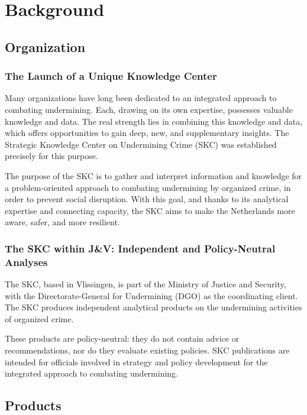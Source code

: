 \section{Background}
\label{sec:Background}

\subsection{Organization}
\label{subsec:Organization}

\subsubsection{The Launch of a Unique Knowledge Center}
\label{subsubsec:SKC-launch}
Many organizations have long been dedicated to an integrated approach to combating undermining. Each, drawing on its own expertise, possesses valuable knowledge and data. The real strength lies in combining this knowledge and data, which offers opportunities to gain deep, new, and supplementary insights. The Strategic Knowledge Center on Undermining Crime (SKC) was established precisely for this purpose.

The purpose of the SKC is to gather and interpret information and knowledge for a problem-oriented approach to combating undermining by organized crime, in order to prevent social disruption. With this goal, and thanks to its analytical expertise and connecting capacity, the SKC aims to make the Netherlands more aware, safer, and more resilient.

\subsubsection{The SKC within J\&V: Independent and Policy-Neutral Analyses}
\label{subsubsec:SKC-JV}
The SKC, based in Vlissingen, is part of the Ministry of Justice and Security, with the Directorate-General for Undermining (DGO) as the coordinating client. The SKC produces independent analytical products on the undermining activities of organized crime. 

These products are policy-neutral: they do not contain advice or recommendations, nor do they evaluate existing policies. SKC publications are intended for officials involved in strategy and policy development for the integrated approach to combating undermining.

\subsection{Products}
\label{subsec:Products}

